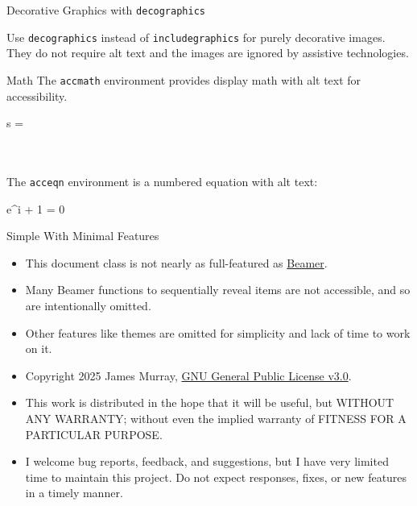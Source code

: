 \documentclass[colortheme={8,92,150}, fontsize=18pt]{accessslides}
\begin{document}
\begin{slide}{Decorative Graphics with \texttt{decographics}}


  Use \texttt{decographics} instead of \texttt{includegraphics} for purely decorative images. They do not require alt text and the images are ignored by assistive technologies.
\end{slide}

\begin{slide}{Math}
  The \texttt{accmath} environment provides display math with alt text for accessibility. \\
  
  \begin{accmath}
    s = 
  \end{accmath}

  \ \\ \ \\
  The \texttt{acceqn} environment is a numbered equation with alt text: 

  \begin{acceqn}
    e^{i\pi} + 1 = 0 
  \end{acceqn}
\end{slide}

\begin{slide}{Simple With Minimal Features}
  \vspace*{-0.25in}
  \begin{itemize}
    \item This document class is not nearly as full-featured as \href{https://latex-beamer.com/}{Beamer}.
    \item Many Beamer functions to sequentially reveal items are not accessible, and so are intentionally omitted.
    \item Other features like themes are omitted for simplicity and lack of time to work on it.
    \item Copyright 2025 James Murray, \href{https://www.gnu.org/licenses/gpl-3.0.en.html}{GNU General Public License v3.0}.
    \item This work is distributed in the hope that it will be useful, but WITHOUT ANY WARRANTY; without even the implied warranty of FITNESS FOR A PARTICULAR PURPOSE.
    \item I welcome bug reports, feedback, and suggestions, but I have very limited time to maintain this project. Do not expect responses, fixes, or new features in a timely manner.
  \end{itemize}
\end{slide}
\end{document}
